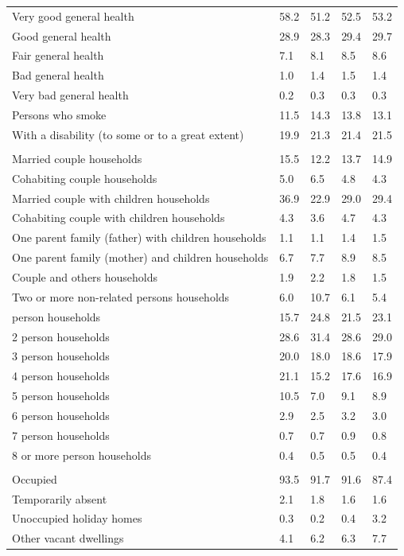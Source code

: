 \documentclass{article}
\begin{document}
\begin{table}[h]
\begin{tabular}{KTTTT}
    \hline
Very good general health & 58.2& 51.2&52.5& 53.2\\
Good general health & 28.9& 28.3& 29.4& 29.7\\
Fair general health & 7.1& 8.1&8.5& 8.6\\
Bad general health & 1.0& 1.4&1.5& 1.4\\
Very bad general health & 0.2& 0.3&0.3& 0.3\\
    \hline
Persons who smoke & 11.5& 14.3&13.8& 13.1\\
    \hline
With a disability (to some or to a great extent) & 19.9& 21.3&21.4& 21.5\\
\hline
    \\ 
    \hline
Married couple households & 15.5& 12.2& 13.7& 14.9\\
Cohabiting couple households & 5.0& 6.5& 4.8& 4.3\\
Married couple with children households & 36.9& 22.9& 29.0& 29.4\\
Cohabiting couple with children households & 4.3& 3.6& 4.7& 4.3\\
One parent family (father) with  children households & 1.1& 1.1& 1.4& 1.5\\
One parent family (mother) and children households & 6.7& 7.7& 8.9& 8.5\\
Couple and others households  & 1.9& 2.2& 1.8& 1.5\\
Two or more non-related persons households &  6.0& 10.7&  6.1&  5.4\\
     person households & 15.7& 24.8& 21.5& 23.1\\
2 person households & 28.6& 31.4& 28.6& 29.0\\
3 person households & 20.0& 18.0& 18.6& 17.9\\
4 person households & 21.1& 15.2& 17.6& 16.9\\
5 person households & 10.5&  7.0&  9.1&  8.9\\
6 person households & 2.9& 2.5& 3.2& 3.0\\
7 person households & 0.7& 0.7& 0.9& 0.8\\
8 or more person households & 0.4& 0.5& 0.5& 0.4\\
\hline
    \\ 
    \hline
Occupied & 93.5& 91.7& 91.6& 87.4\\
Temporarily absent & 2.1& 1.8& 1.6& 1.6\\
Unoccupied holiday homes & 0.3& 0.2& 0.4& 3.2\\
Other vacant dwellings & 4.1& 6.2& 6.3& 7.7\\
\hline
\end{tabular}
\end{table}
\end{document}
